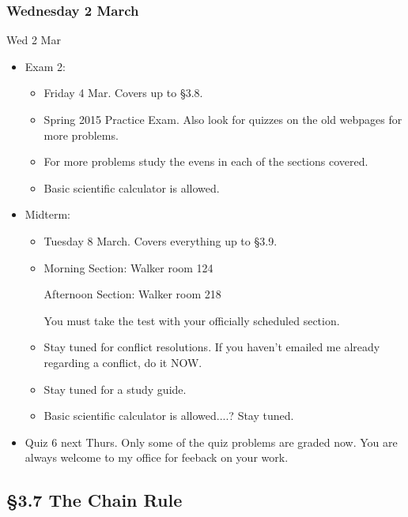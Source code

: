 \documentclass[cal1spr16Lectures.tex]{subfiles}
\begin{document}

\subsubsection{\bf Wednesday 2 March}
\begin{frame}[allowframebreaks]{Wed 2 Mar}
\begin{itemize}
\item Exam 2:
	\begin{itemize}%
	\item Friday 4 Mar.  Covers up to \S 3.8.
	\item Spring 2015 Practice Exam.  Also look for quizzes on the old webpages for more problems.
	\item For more problems study the evens in each of the sections covered.
	\item Basic scientific calculator is allowed.
	\end{itemize}
%
\framebreak	
\item Midterm:
	\begin{itemize}%
	\item Tuesday 8 March.  Covers \alert{everything} up to \alert{\S 3.9}.
	\item Morning Section: Walker room 124
	
	Afternoon Section: Walker room 218
	
	You must take the test with your officially scheduled section.
	\item Stay tuned for conflict resolutions.  If you haven't emailed me already regarding a conflict, do it NOW.
	\item Stay tuned for a study guide.
	\item Basic scientific calculator is allowed....? Stay tuned.
	\end{itemize}
%
\framebreak	
\item Quiz 6 next Thurs.  Only some of the quiz problems are graded now.  You are always welcome to my office for feeback on your work.	
\end{itemize}
\end{frame}

\subsection[3.7 The Chain Rule]{\S 3.7 The Chain Rule}
\end{document}
